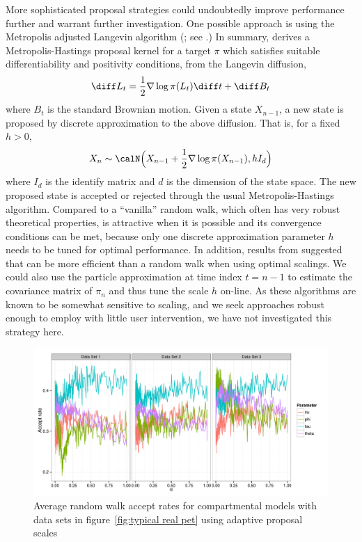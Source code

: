 More sophisticated proposal strategies could undoubtedly improve performance
further and warrant further investigation. One possible approach is using the
Metropolis adjusted Langevin algorithm (\mala; see \cite{Roberts:1996vd}.) In
summary, \mala derives a Metropolis-Hastings proposal kernel for a target
$\pi$ which satisfies suitable differentiability and positivity conditions,
from the Langevin diffusion,
\begin{equation*}
  \diff L_t = \frac{1}{2}\nabla\log\pi(L_t)\diff t + \diff B_t
\end{equation*}
where $B_t$ is the standard Brownian motion. Given a state $X_{n-1}$, a new
state is proposed by discrete approximation to the above diffusion. That is,
for a fixed $h>0$,
\begin{equation}
  X_n\sim\calN\Bigl(X_{n-1}+\frac{1}{2}\nabla\log\pi(X_{n-1}), hI_d\Bigr)
\end{equation}
where $I_d$ is the identify matrix and $d$ is the dimension of the state
space. The new proposed state is accepted or rejected through the usual
Metropolis-Hastings algorithm. Compared to a ``vanilla'' random walk, which
often has very robust theoretical properties, \mala is attractive when it is
possible and its convergence conditions \cite{Roberts:1996vd} can be met,
because only one discrete approximation parameter $h$ needs to be tuned
for optimal performance. In addition, results from \cite{Roberts:2001ta}
suggested that \mala can be more efficient than a random walk when using
optimal scalings. We could also use the particle approximation at time index
$t = n - 1$ to estimate the covariance matrix of $\pi_{n}$ and thus tune the
scale $h$ on-line. As these algorithms are known to be somewhat sensitive to
scaling, and we seek approaches robust enough to employ with little user
intervention, we have not investigated this strategy here.

\begin{figure}[t]
  \includegraphics[width=\linewidth]{fig/Adaptive_Proposal}
  \caption{Average random walk accept rates for \pet compartmental models with
    data sets in figure~\ref{fig:typical real pet} using adaptive
    proposal scales}
  \label{fig:pet adaptive proposal}
\end{figure}

